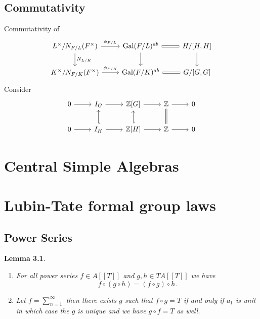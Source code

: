 \documentclass[twoside, 12pt]{iiser-thesis}
\newtheorem{lem}[thm]{ Lemma}
\newcommand{\Z}{\mathbb{Z}}
\newcommand{\gal}{\text{Gal}}
\begin{document}
\section{Commutativity}
Commutativity of 
$$\begin{tikzcd}
L^\times/N_{F/L}(F^\times) \arrow[d, "N_{L/K}"] \arrow[r, "\phi_{F/L}"]  & \gal(F/L)^{ab} \arrow[d ] \arrow[r, equal]  &   {H/[H,H]} \arrow[d] \\
K^\times/N_{F/K}(F^\times) \arrow[r, "\phi _{F/K}"]& \gal(F/K)^{ab} \arrow[r, equal] &   {G/[G,G]}
\end{tikzcd}$$
Consider 
$$\begin{tikzcd}
0 \arrow[r] & I_G \arrow[r] \arrow[d, hookleftarrow] & \Z [G] \arrow[r] \arrow[d, hookleftarrow] & \Z \arrow[d, equal] \arrow[r]& 0 \\
0 \arrow[r] & I_H \arrow[r] &\Z [H] \arrow[r] & \Z \arrow[r] &0
\end{tikzcd}$$




\chapter{Central Simple Algebras}

\chapter{Lubin-Tate formal group laws}
\section{Power Series}
\begin{lem}
\begin{enumerate}
    \item For all power series $f\in A[[T]]$ and $g,h \in TA[[T]]$ we have $$f\circ (g\circ h)=(f\circ g) \circ h.$$
    \item Let $f= \sum _{n=1}^\infty $ then there exists $g$ such that $f \circ g=T$ if and only if $a_1$ is unit in which case the $g$ is unique and we have $g \circ f =T$ as well.
\end{enumerate}
\end{lem}
\end{document}
